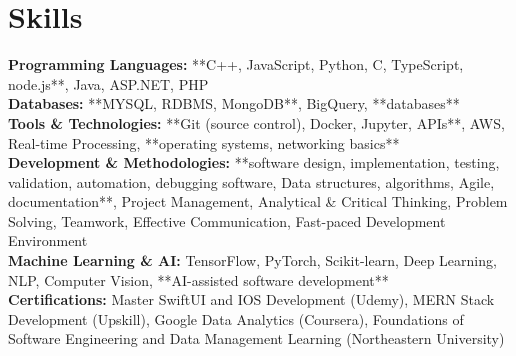 \documentclass[a4paper,10pt]{article}
\begin{document}
\section*{Skills}
\textbf{Programming Languages: } **C++, JavaScript, Python, C, TypeScript, node.js**, Java, ASP.NET, PHP \\
\textbf{Databases: } **MYSQL, RDBMS, MongoDB**, BigQuery, **databases** \\
\textbf{Tools \& Technologies: } **Git (source control), Docker, Jupyter, APIs**, AWS, Real-time Processing, **operating systems, networking basics** \\
\textbf{Development \& Methodologies: } **software design, implementation, testing, validation, automation, debugging software, Data structures, algorithms, Agile, documentation**, Project Management, Analytical \& Critical Thinking, Problem Solving, Teamwork, Effective Communication, Fast-paced Development Environment \\
\textbf{Machine Learning \& AI: } TensorFlow, PyTorch, Scikit-learn, Deep Learning, NLP, Computer Vision, **AI-assisted software development** \\
\textbf{Certifications: } Master SwiftUI and IOS Development (Udemy), MERN Stack Development (Upskill), Google Data Analytics (Coursera), Foundations of Software Engineering and Data Management Learning (Northeastern University) \\

\vspace{-4mm}
\end{document}
